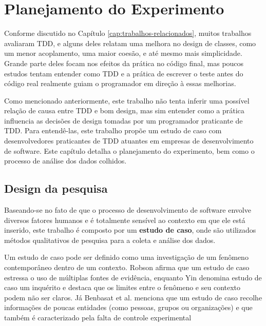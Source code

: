 \chapter{Planejamento do Experimento}
\label{cap:planejamento}

Conforme discutido no Capítulo \ref{cap:trabalhos-relacionados}, muitos 
trabalhos avaliaram TDD, e alguns deles relatam uma melhora
no design de classes, como um menor acoplamento, uma maior coesão, e até mesmo
mais simplicidade. 
Grande parte deles focam nos efeitos da prática
no código final, mas poucos estudos tentam entender como TDD e a
prática de escrever o teste antes do código real realmente guiam o programador 
em direção à essas melhorias.

Como mencionado anteriormente, 
este trabalho não tenta inferir uma possível relação de causa entre TDD e
bom design, mas sim entender como a prática influencia as decisões de 
design tomadas por um programador praticante de TDD.
Para entendê-las, este trabalho propõe um estudo de caso com 
desenvolvedores praticantes de TDD atuantes em empresas de desenvolvimento de
software. Este capítulo detalha o planejamento do experimento, 
bem como o processo de análise dos dados colhidos.

\section{Design da pesquisa}

Baseando-se no fato de que o processo de desenvolvimento de software envolve 
diversos fatores humanos e é totalmente sensível ao contexto em que ele está 
inserido, este trabalho é composto por um \textbf{estudo de caso},
onde são utilizados métodos qualitativos de pesquisa para a coleta e 
análise dos dados.

Um estudo de caso pode ser definido como uma investigação de um fenômeno 
contemporâneo dentro de um contexto. Robson \cite{robson}
afirma que um estudo de caso estressa o uso de múltiplas fontes de
evidência, enquanto Yin \cite{yin}
denomina estudo de caso um inquérito e destaca que os limites 
entre o fenômeno e seu contexto podem não ser claros. Já 
Benbasat et al. \cite{benbasat} menciona que um estudo de caso recolhe informações 
de poucas entidades (como pessoas, grupos ou organizações) e que também é 
caracterizado pela falta de controle experimental

